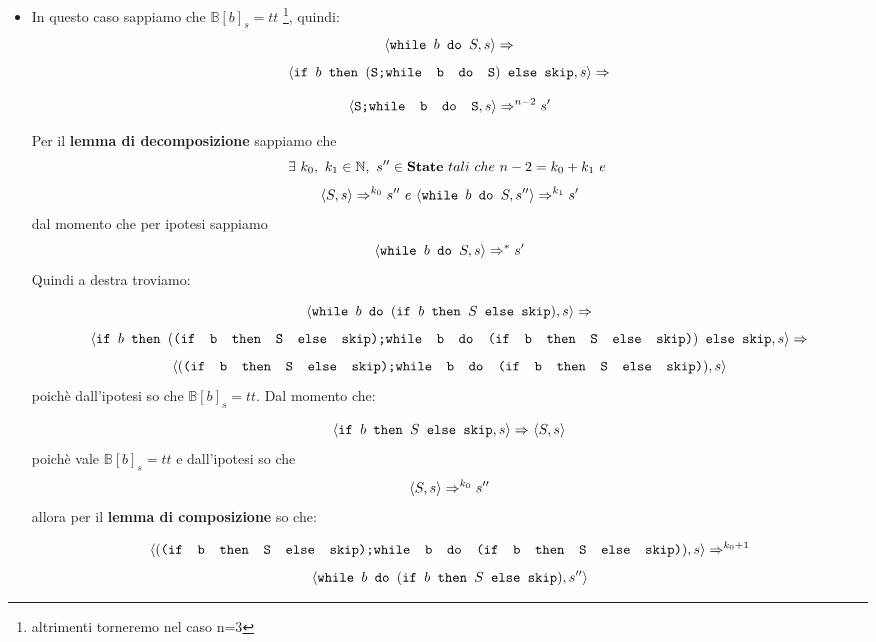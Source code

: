 {\begin{itemize}
\[ 	\confSs{\wbS{b}{S}}{s}\Rar{} \]
\[ 	\confSs{
		\ifABC{b}
			{(\concat{S}{\wbS{b}{S}})}
			{\skipistr}
	}{s}\Rar{}
	\confSs{\skipistr}{s}\Rar{}s \]

	Quindi nel caso in cui  evolva in tre passi in una
	configurazione finale a destra avremo:

\[ 	\confSs{\wbS{b}{(\ifABC{b}{S}{\skipistr})}}{s}\Rar{} \]
	{\small
	\[ \confSs{
		\ifABC{b}
		{(\concat{(\ifABC{b}{S}{\skipistr})}
		{\wbS{b}{(\ifABC{b}{S}{\skipistr})}})}
		{\skipistr}
	}{s} \]
}

	Dall'ipotesi sappiamo che $\mathbb{B}[b]_s=ff$ quindi:
	{\small
\[\confSs{ 
		\ifABC{b}
		{(\concat{(\ifABC{b}{S}{\skipistr})}	
		{\wbS{b}{(\ifABC{b}{S}{\skipistr})}})}
		{\skipistr}
	}{s}\Rar{} \]
}
\[\confSs{\skipistr}{s}\Rar{}{s} \]

	E quindi entrambi i programmi evolvono nello stesso stato finale.\\

\item	{} In questo caso sappiamo che $\mathbb{B}[b]_s=tt$
	\footnote{altrimenti torneremo nel caso n=3}, quindi:
\[\confSs{\wbS{b}{S}}{s}\Rar{} \]
 {\small
\[\confSs{
		\ifABC{b}
			{(\concat{S}{\wbS{b}{S}})}
			{\skipistr}
	}{s}\Rar{} \]
}

	\[\confSs{\concat{S}{\wbS{b}{S}}}{s}\Rar{n-2}s' \]

	Per il \textbf{lemma di decomposizione} sappiamo che 
	\[ \exists{}~k_0,~k_1\in\mathbb{N},~s''\in\states~tali~che~n-2=k_0+k_1~e~\]
	\[
	\confSs{S}{s}\Rar{k_0}s''~e~\confSs{\wbS{b}{S}}{s''}\Rar{k_1}s' \]dal
	momento che per ipotesi sappiamo \[ \confSs{\wbS{b}{S}}{s}\Rar{*}s' \]
	Quindi a destra troviamo:

	\[ \confSs{\wbS{b}{(\ifABC{b}{S}{\skipistr})}}{s}\Rar{} \]
	{\small
	\[ \confSs{
		\ifABC{b}
		{(\concat{(\ifABC{b}{S}{\skipistr})}
		{\wbS{b}{(\ifABC{b}{S}{\skipistr})}})}
		{\skipistr}}{s}\Rar{} \]}
	\[ \confSs{
		{(\concat{(\ifABC{b}{S}{\skipistr})}
		{\wbS{b}{(\ifABC{b}{S}{\skipistr})}})}
	}{s} \]
	poichè dall'ipotesi so che $\mathbb{B}[b]_s=tt$.
	 Dal momento che:
	
\[ 	\confSs{\ifABC{b}{S}{\skipistr}}{s}\Rar{}\confSs{S}{s} \]
	poichè vale 
	$\mathbb{B}[b]_s=tt$ e dall'ipotesi so che 
\[ 	\confSs{S}{s}\Rar{k_0}s'' \]
	allora per il \textbf{lemma di composizione} so che:

\[ 	\confSs{
		{(\concat{(\ifABC{b}{S}{\skipistr})}
		{\wbS{b}{(\ifABC{b}{S}{\skipistr})}})}
	}{s}\Rar{k_0+1} \]
\[ 	\confSs{\wbS{b}{(\ifABC{b}{S}{\skipistr})}}{s''} \]


\end{itemize}}
